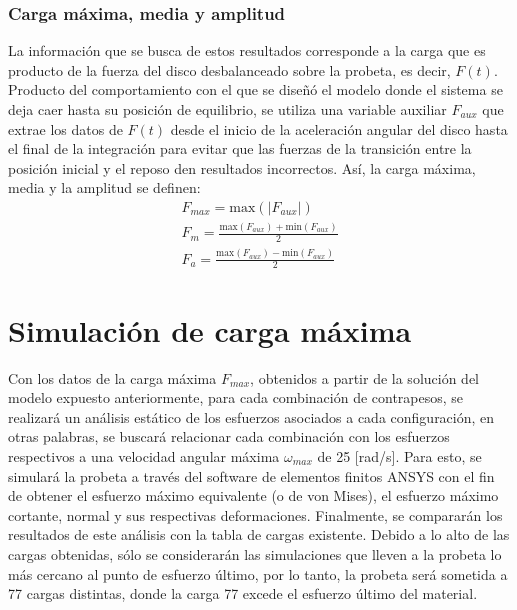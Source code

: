 \subsubsection{Carga máxima, media y amplitud}
La información que se busca de estos resultados corresponde a la carga que es producto de la fuerza del disco desbalanceado sobre la probeta, es decir, $F(t)$. Producto del comportamiento con el que se diseñó el modelo donde el sistema se deja caer hasta su posición de equilibrio,  se utiliza una variable auxiliar $F_{aux}$ que extrae los datos de $F(t)$ desde el inicio de la aceleración angular del disco hasta el final de la integración para evitar que las fuerzas de la transición entre la posición inicial y el reposo den resultados incorrectos. Así, la carga máxima, media y la amplitud se definen:
\begin{gather} 
	F_{max} = \text{max}(|F_{aux}|) \label{eq:f_max}\\
	F_m = \frac{\text{max}(F_{aux}) + \text{min}(F_{aux})}{2} \label{eq:f_m}\\
	F_a = \frac{\text{max}(F_{aux}) - \text{min}(F_{aux})}{2} \label{eq:f_a}
\end{gather}

\section{Simulación de carga máxima}
Con los datos de la carga máxima $F_{max}$, obtenidos a partir de la solución del modelo expuesto anteriormente, para cada combinación de contrapesos, se realizará un análisis estático de los esfuerzos asociados a cada configuración, en otras palabras, se buscará relacionar cada combinación con los esfuerzos respectivos a una velocidad angular máxima $\omega_{max}$ de 25 [rad/s]. Para esto, se simulará la probeta a través del software de elementos finitos ANSYS con el fin de obtener el esfuerzo máximo equivalente (o de von Mises), el esfuerzo máximo cortante, normal y sus respectivas deformaciones. Finalmente, se compararán los resultados de este análisis con la tabla de cargas existente. Debido a lo alto de las cargas obtenidas, sólo se considerarán las simulaciones que lleven a la probeta lo más cercano al punto de esfuerzo último, por lo tanto, la probeta será sometida a 77 cargas distintas, donde la carga 77 excede el esfuerzo último del material.

